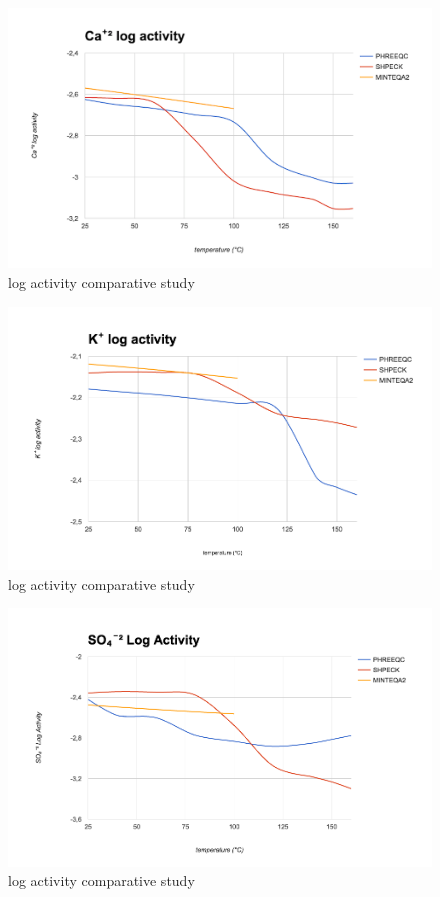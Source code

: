 \begin{figure}[ht!]
\centering
\includegraphics[width=140mm]{figures/ca+2.png}
\caption{ log activity comparative study}
\label{fig:ca+2}
\end{figure}

\begin{figure}[ht!]
\centering
\includegraphics[width=140mm]{figures/k+.png}
\caption{ log activity comparative study}
\label{fig:k+}
\end{figure}

\begin{figure}[ht!]
\centering
\includegraphics[width=140mm]{figures/so4-2.png}
\caption{ log activity comparative study}
\label{fig:so4-2}
\end{figure}


